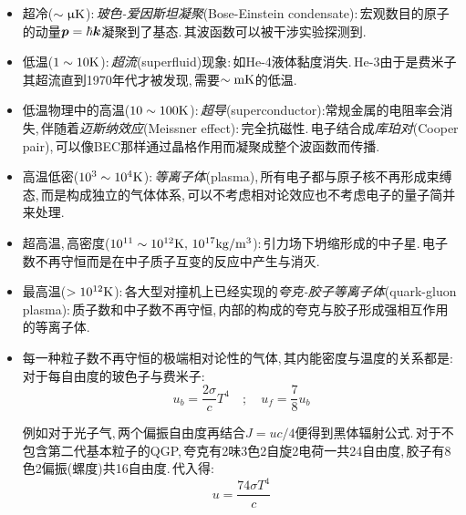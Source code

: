 \begin{itemize}
	\item 超冷($\sim {\rm \upmu K}$):\,\emph{玻色-爱因斯坦凝聚}(Bose-Einstein condensate):\,宏观数目的原子的动量$\boldsymbol{p}=\hbar \boldsymbol{k}$凝聚到了基态.\,其波函数可以被干涉实验探测到.
	\item 低温($1\sim 10{\rm K}$):\,\emph{超流}(superfluid)现象:\,如He-4液体黏度消失.\,He-3由于是费米子其超流直到1970年代才被发现,\,需要$\sim {\rm mK}$的低温.
	\item 低温物理中的高温($10\sim 100{\rm K}$):\,\emph{超导}(superconductor):\;常规金属的电阻率会消失,\,伴随着\emph{迈斯纳效应}(Meissner effect):\,完全抗磁性.\,电子结合成\emph{库珀对}(Cooper pair),\,可以像BEC那样通过晶格作用而凝聚成整个波函数而传播.

	\item 高温低密($10^3 \sim 10^4{\rm K}$):\,\emph{等离子体}(plasma),\,所有电子都与原子核不再形成束缚态,\,而是构成独立的气体体系,\,可以不考虑相对论效应也不考虑电子的量子简并来处理.\,

	\item 超高温,\,高密度($10^{11} \sim 10^{12}{\rm K},\,10^{17}{\rm kg/m^3}$):\,引力场下坍缩形成的中子星.\,电子数不再守恒而是在中子质子互变的反应中产生与消灭.\,

	\item 最高温($>10^{12}{\rm K}$):\,各大型对撞机上已经实现的\emph{夸克-胶子等离子体}(quark-gluon plasma):\,质子数和中子数不再守恒,\,内部的构成的夸克与胶子形成强相互作用的等离子体.\,

	\item 每一种粒子数不再守恒的极端相对论性的气体,\,其内能密度与温度的关系都是:\,对于每自由度的玻色子与费米子:
	\[u_b=\frac{2\sigma}{c}T^4\quad ;\quad u_f=\frac{7}{8}u_b\]

	例如对于光子气,\,两个偏振自由度再结合$J=uc/4$便得到黑体辐射公式.\,对于不包含第二代基本粒子的QGP,\,夸克有2味3色2自旋2电荷一共24自由度,\,胶子有8色2偏振(螺度)共16自由度.\,代入得:
	\[u=\frac{74\sigma T^4}{c}\]
\end{itemize}